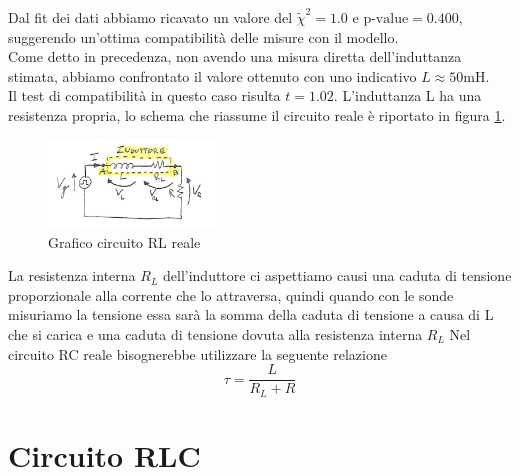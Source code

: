 \documentclass[letterpaper,12pt]{article}
\begin{document}
Dal fit dei dati abbiamo ricavato un valore del $\widetilde{\chi}^2 = 1.0$ e $\text{p-value} = 0.400$, suggerendo un'ottima compatibilità delle misure con il modello.\\
Come detto in precedenza, non avendo una misura diretta dell'induttanza stimata, abbiamo confrontato il valore ottenuto con uno indicativo $L \approx 50 \text{mH}$.\\
Il test di compatibilità in questo caso risulta $t = 1.02$.
L'induttanza L ha una resistenza propria, lo schema che riassume il circuito reale è riportato in figura \ref{fig:reale}. \\
\begin{figure}[h!] 
  \centering
\includegraphics[width=0.4\textwidth]{RL reale.png} 
  \caption{Grafico circuito RL reale}
  \label{fig:reale}
\end{figure}
La resistenza interna $R_L$ dell'induttore ci aspettiamo causi una caduta di tensione proporzionale alla corrente che lo attraversa, quindi quando con le sonde misuriamo la tensione essa sarà la somma della caduta di tensione a causa di L che si carica e una caduta di tensione dovuta alla resistenza interna $R_L$
Nel circuito RC reale bisognerebbe utilizzare la seguente relazione $$\tau = \frac{L}{R_L + R}$$

\newpage

\section{Circuito RLC}
\end{document}
